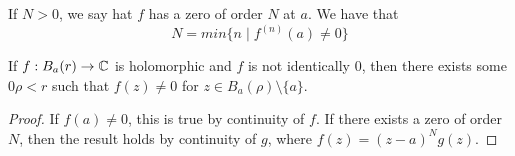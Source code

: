 \begin{definition}
  If $N > 0$, we say hat $f$ has a zero of order $N$ at $a$. We have that
\[
N = min \{ n \mid f^{(n)}(a) \neq 0 \}
\]
\end{definition}

\begin{proposition}[name=Principle of isolated zeros]
  If $f : B_a(r) \rightarrow \mathbb{C}$ is holomorphic and $f$ is not identically $0$, then there exists some $0 \rho < r$ such that $f(z) \neq 0$ for $z \in B_a(\rho) \setminus \{ a \}$.
\end{proposition}

\begin{proof}
  If $f(a) \neq 0$, this is true by continuity of $f$.
  If there exists a zero of order $N$, then the result holds by continuity of $g$, where $f(z) = (z-a)^N g(z)$.
\end{proof}

